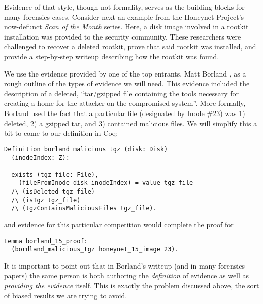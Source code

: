 \documentclass[nocopyrightspace]{sigplanconf}
\begin{document}
Evidence of that style, though not formality, serves as the building blocks
for many forensics cases. Consider next an example \cite{honeynet-15} from the
Honeynet Project's now-defunct {\it Scan of the Month} series. Here, a disk
image involved in a rootkit installation was provided to the security
community. These researchers were challenged to recover a deleted rootkit,
prove that said rootkit was installed, and provide a step-by-step writeup
describing how the rootkit was found.

We use the evidence provided by one of the top entrants, Matt Borland
\cite{borland-honeynet}, as a rough outline of the types of evidence we will
need. This evidence included the description of a deleted, ``tar/gzipped file
containing the tools necessary for creating a home for the attacker on the
compromised system''. More formally, Borland used the fact that a particular
file (designated by Inode \#23) was 1) deleted, 2) a gzipped tar, and 3)
contained malicious files. We will simplify this a bit to come to our
definition in Coq:

\begin{lstlisting}
Definition borland_malicious_tgz (disk: Disk) 
  (inodeIndex: Z): 
  
  exists (tgz_file: File),
    (fileFromInode disk inodeIndex) = value tgz_file
  /\ (isDeleted tgz_file)
  /\ (isTgz tgz_file)
  /\ (tgzContainsMaliciousFiles tgz_file).
\end{lstlisting}

and evidence for this particular competition would complete the proof for

\begin{lstlisting}
Lemma borland_15_proof: 
  (bordland_malicious_tgz honeynet_15_image 23).
\end{lstlisting}

It is important to point out that in Borland's writeup (and in many forensics
papers) the same person is both authoring the {\it definition} of evidence as
well as {\it providing the evidence} itself. This is exactly the problem
discussed above, the sort of biased results we are trying to avoid.

\end{document}
